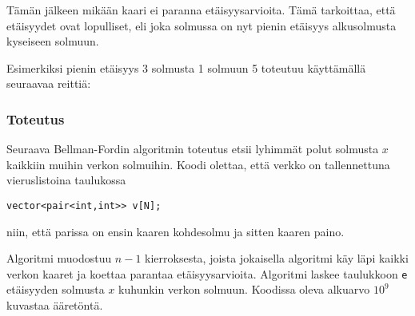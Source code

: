 Tämän jälkeen mikään kaari
ei paranna etäisyysarvioita.
Tämä tarkoittaa, että etäisyydet
ovat lopulliset, eli joka solmussa
on nyt pienin etäisyys alkusolmusta
kyseiseen solmuun.

Esimerkiksi pienin etäisyys 3
solmusta 1 solmuun 5 toteutuu käyttämällä
seuraavaa reittiä:

\begin{center}
\end{center}

\subsubsection{Toteutus}

Seuraava Bellman-Fordin algoritmin toteutus
etsii lyhimmät polut solmusta $x$
kaikkiin muihin verkon solmuihin.
Koodi olettaa, että verkko on tallennettuna
vieruslistoina taulukossa
\begin{lstlisting}
vector<pair<int,int>> v[N];
\end{lstlisting}
niin, että parissa on ensin kaaren kohdesolmu
ja sitten kaaren paino.

Algoritmi muodostuu $n-1$ kierroksesta,
joista jokaisella algoritmi käy läpi kaikki
verkon kaaret ja koettaa parantaa etäisyysarvioita.
Algoritmi laskee taulukkoon \texttt{e}
etäisyyden solmusta $x$ kuhunkin verkon solmuun.
Koodissa oleva alkuarvo $10^9$ kuvastaa
ääretöntä.

